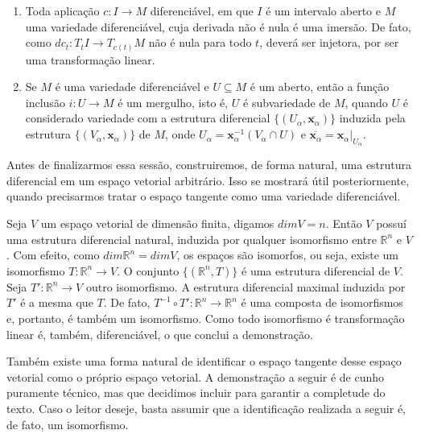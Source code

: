 \begin{examples}
    \label{loc:exemplos_de_imersões_e_mergulhos}
    \begin{enumerate}
        \item Toda aplicação $c:I\to M$ diferenciável, em que $I$ é um intervalo aberto e $M$ uma variedade diferenciável, cuja derivada não é nula é uma imersão. De fato, como $dc_{t}:T_{t}I\to T_{c(t)}M$ não é nula para todo $t$, deverá ser injetora, por ser uma transformação linear.
        \item Se $M$ é uma variedade diferenciável e $U\subseteq M$ é um aberto, então a função inclusão $i:U\to M$ é um mergulho, isto é, $U$ é subvariedade de $M$, quando $U$ é considerado variedade com a estrutura diferencial $\{ (U_{\alpha}, \overline{\mathbf{x}_{\alpha}}) \}$ induzida pela estrutura $\{ (V_{\alpha}, \mathbf{x}_{\alpha}) \}$ de $M$, onde $U_{\alpha}=\mathbf{x}_{\alpha}^{-1}(V_{\alpha}\cap U)$ e $\overline{\mathbf{x}_{\alpha}}=\mathbf{x}_{\alpha}|_{U_\alpha}$.
    \end{enumerate}
\end{examples}
Antes de finalizarmos essa sessão, construiremos, de forma natural, uma estrutura diferencial em um espaço vetorial arbitrário. Isso se mostrará útil posteriormente, quando precisarmos tratar o espaço tangente como uma variedade diferenciável.
\begin{lemma}
    \label{loc:!resultados_extras_importantes!.construir_uma_estrutura_diferencial_natural_em_um_espaço_vetorial_v}
    Seja $V$ um espaço vetorial de dimensão finita, digamos $dimV=n$. Então $V$ possuí uma estrutura diferencial natural, induzida por qualquer isomorfismo entre $\mathbb{R}^{n}$ e $V$.
    Com efeito, como $dim\mathbb{R}^{n}=dimV$, os espaços são isomorfos, ou seja, existe um isomorfismo $T:\mathbb{R}^{n}\to V$. O conjunto $\{ (\mathbb{R}^{n},T) \}$ é uma estrutura diferencial de $V$.
    Seja $T':\mathbb{R}^{n}\to V$ outro isomorfismo. A estrutura diferencial maximal induzida por $T'$ é a mesma que $T$. De fato, $T^{-1} \circ T':\mathbb{R}^{n}\to \mathbb{R}^{n}$ é uma composta de isomorfismos e, portanto, é também um isomorfismo. Como todo isomorfismo é transformação linear é, também, diferenciável, o que conclui a demonstração.
\end{lemma}
Também existe uma forma natural de identificar o espaço tangente desse espaço vetorial como o próprio espaço vetorial. A demonstração a seguir é de cunho puramente técnico, mas que decidimos incluir para garantir a completude do texto. Caso o leitor deseje, basta assumir que a identificação realizada a seguir é, de fato, um isomorfismo.
